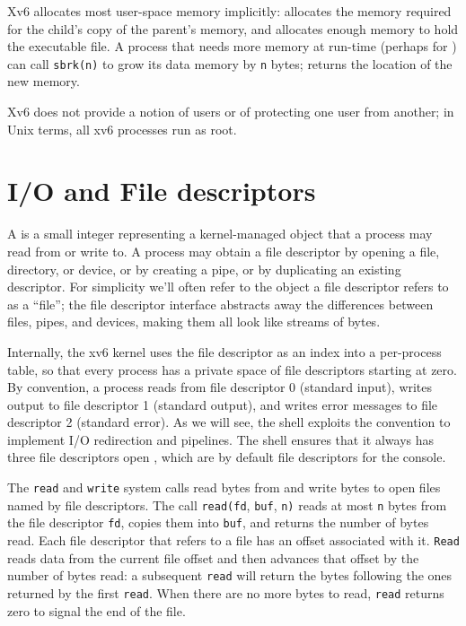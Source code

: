 Xv6 allocates most user-space memory
implicitly:
allocates the memory required for the child's copy of the
parent's memory, and 
allocates enough memory to hold the executable file.
A process that needs more memory at run-time (perhaps for
)
can call
\lstinline{sbrk(n)}
to grow its data memory by
\lstinline{n}
bytes;
returns the location of the new memory.

Xv6 does not provide a notion of users or of protecting
one user from another; in Unix terms, all xv6 processes
run as root.
\section{I/O and File descriptors}

A 
is a small integer representing a kernel-managed object
that a process may read from or write to.
A process may obtain a file descriptor by opening a file, directory,
or device, or by creating a pipe, or by duplicating an existing
descriptor.
For simplicity we'll often refer to the object a file descriptor
refers to as a ``file'';
the file descriptor interface abstracts away the differences between
files, pipes, and devices, making them all look like streams of bytes.

Internally, the xv6 kernel uses the file descriptor
as an index into a per-process table,
so that every process has a private space of file descriptors
starting at zero.
By convention, a process reads from file descriptor 0 (standard input),
writes output to file descriptor 1 (standard output), and
writes error messages to file descriptor 2 (standard error).
As we will see, the shell exploits the convention to implement I/O redirection
and pipelines. The shell ensures that it always has three file descriptors
open
,
which are by default file descriptors for the console.

The
\lstinline{read}
and
\lstinline{write}
system calls read bytes from and write bytes to
open files named by file descriptors.
The call
\lstinline{read(fd},
\lstinline{buf},
\lstinline{n)}
reads at most
\lstinline{n}
bytes from the file descriptor
\lstinline{fd},
copies them into
\lstinline{buf},
and returns the number of bytes read.
Each file descriptor that refers to a file
has an offset associated with it.
\lstinline{Read}
reads data from the current file offset and then advances
that offset by the number of bytes read:
a subsequent
\lstinline{read}
will return the bytes following the ones returned by the first
\lstinline{read}.
When there are no more bytes to read,
\lstinline{read}
returns zero to signal the end of the file.

